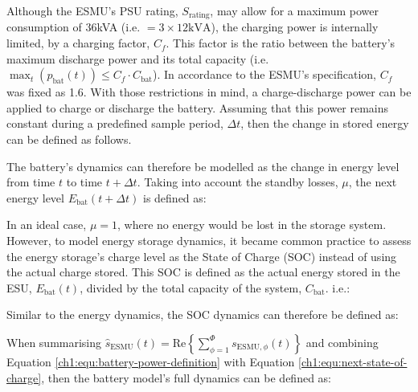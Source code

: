 


Although the ESMU's PSU rating, $S_\text{rating}$, may allow for a maximum power consumption of 36kVA (i.e. $=3\times12\text{kVA}$), the charging power is internally limited, by a charging factor, $C_f$.
This factor is the ratio between the battery's maximum discharge power and its total capacity (i.e. $\max_t (p_\text{bat}(t)) \leq C_f \cdot C_\text{bat}$).
In accordance to the ESMU's specification, $C_f$ was fixed as 1.6.
With those restrictions in mind, a charge-discharge power can be applied to charge or discharge the battery.
Assuming that this power remains constant during a predefined sample period, $\Delta t$, then the change in stored energy can be defined as follows.



\nomenclature[I]{$\mu$}{Self-discharge losses of battery, where $\mu \in (0, 1]$ (Chapter \ref{ch1})}

The battery's dynamics can therefore be modelled as the change in energy level from time $t$ to time $t+\Delta t$.
Taking into account the standby losses, $\mu$, the next energy level $E_\text{bat}(t+\Delta t)$ is defined as:



In an ideal case, $\mu = 1$, where no energy would be lost in the storage system.
However, to model energy storage dynamics, it became common practice to assess the energy storage's charge level as the State of Charge (SOC) instead of using the actual charge stored.
This SOC is defined as the actual energy stored in the ESU, $E_\text{bat}(t)$, divided by the total capacity of the system, $C_\text{bat}$. i.e.:



Similar to the energy dynamics, the SOC dynamics can therefore be defined as:



When summarising $\hat{s}_\text{ESMU}(t) = \text{Re}\left\{\sum_{\phi=1}^{\Phi}s_{\text{ESMU},\phi}(t)\right\}$ and combining Equation \ref{ch1:equ:battery-power-definition} with Equation \ref{ch1:equ:next-state-of-charge}, then the battery model's full dynamics can be defined as:

